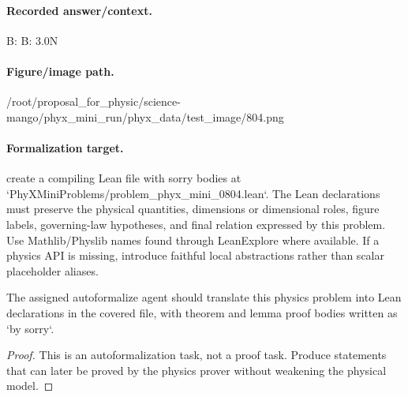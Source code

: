 \paragraph{Recorded answer/context.}
B: B: 3.0N

\paragraph{Figure/image path.}
/root/proposal\_for\_physic/science-mango/phyx\_mini\_run/phyx\_data/test\_image/804.png

\paragraph{Formalization target.}
create a compiling Lean file with sorry bodies at `PhyXMiniProblems/problem\_phyx\_mini\_0804.lean`. The Lean declarations must preserve the physical quantities, dimensions or dimensional roles, figure labels, governing-law hypotheses, and final relation expressed by this problem.
Use Mathlib/Physlib names found through LeanExplore where available. If a physics API is missing, introduce faithful local abstractions rather than scalar placeholder aliases.

\begin{theorem}
\label{thm:physics:phyx_mini_0804:target}
The assigned autoformalize agent should translate this physics problem into Lean declarations in the covered file, with theorem and lemma proof bodies written as `by sorry`.
\end{theorem}
\begin{proof}
This is an autoformalization task, not a proof task. Produce statements that can later be proved by the physics prover without weakening the physical model.
\end{proof}

